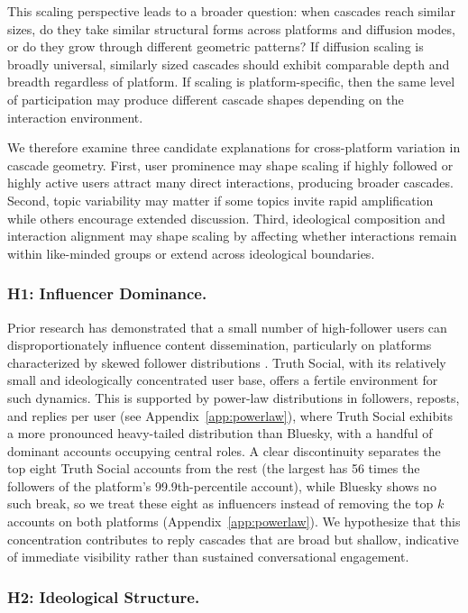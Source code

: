 \documentclass[letterpaper]{article} %
\newcommand{\rev}[1]{{\color{blue}#1}}
\begin{document}
This scaling perspective leads to a broader question: when cascades reach similar sizes, do they take similar structural forms across platforms and diffusion modes, or do they grow through different geometric patterns? If diffusion scaling is broadly universal, similarly sized cascades should exhibit comparable depth and breadth regardless of platform. If scaling is platform-specific, then the same level of participation may produce different cascade shapes depending on the interaction environment.

We therefore examine three candidate explanations for cross-platform variation in cascade geometry. First, user prominence may shape scaling if highly followed or highly active users attract many direct interactions, producing broader cascades. Second, topic variability may matter if some topics invite rapid amplification while others encourage extended discussion. Third, ideological composition and interaction alignment may shape scaling by affecting whether interactions remain within like-minded groups or extend across ideological boundaries. 

\subsubsection{H1: Influencer Dominance.}
Prior research has demonstrated that a small number of high-follower users can disproportionately influence content dissemination, particularly on platforms characterized by skewed follower distributions \cite{goel_structural_2016, zannettou_what_2018}. Truth Social, with its relatively small and ideologically concentrated user base, offers a fertile environment for such dynamics. This is supported by power-law distributions in followers, reposts, and replies per user (see Appendix~\ref{app:powerlaw}), where Truth Social exhibits a more pronounced heavy-tailed distribution than Bluesky, with a handful of dominant accounts occupying central roles. \rev{A clear discontinuity separates the top eight Truth Social accounts from the rest (the largest has 56 times the followers of the platform's 99.9th-percentile account), while Bluesky shows no such break, so we treat these eight as influencers instead of removing the top $k$ accounts on both platforms (Appendix~\ref{app:powerlaw}).} We hypothesize that this concentration contributes to reply cascades that are broad but shallow, indicative of immediate visibility rather than sustained conversational engagement.

\subsubsection{H2: Ideological Structure.}
\end{document}
